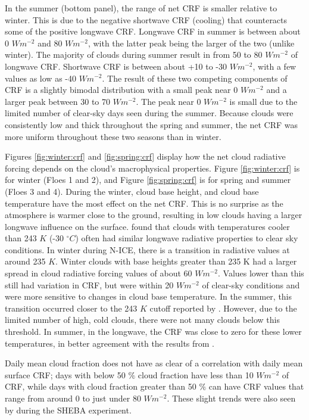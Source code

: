 In the summer (bottom panel), the range of net CRF is smaller relative to winter. This is due to the negative shortwave CRF (cooling) that counteracts some of the positive longwave CRF. Longwave CRF in summer is between about 0 $W m^{-2}$ and 80 $W m^{-2}$, with the latter peak being the larger of the two (unlike winter). The majority of clouds during summer result in from 50 to 80 $W m^{-2}$ of longwave CRF. Shortwave CRF is between about +10 to -30 $W m^{-2}$, with a few values as low as -40 $W m^{-2}$. The result of these two competing components of CRF is a slightly bimodal distribution with a small peak near 0 $W m^{-2}$ and a larger peak between 30 to 70 $W m^{-2}$. The peak near 0 $W m^{-2}$ is small due to the limited number of clear-sky days seen during the summer. Because clouds were consistently low and thick throughout the spring and summer, the net CRF was more uniform throughout these two seasons than in winter.

Figures \ref{fig:winter:crf} and \ref{fig:spring:crf} display how the net cloud radiative forcing depends on the cloud's macrophysical properties. Figure \ref{fig:winter:crf} is for winter (Floes 1 and 2), and Figure \ref{fig:spring:crf} is for spring and summer (Floes 3 and 4). During the winter, cloud base height, and cloud base temperature have the most effect on the net CRF. This is no surprise as the atmosphere is warmer close to the ground, resulting in low clouds having a larger longwave influence on the surface. \citet{shupe:2004} found that clouds with temperatures cooler than 243 $K$ (-30 $^{\circ}C$) often had similar longwave radiative properties to clear sky conditions. In winter during N-ICE, there is a transition in radiative values at around 235 $K$. Winter clouds with base heights greater than 235 K had a larger spread in cloud radiative forcing values of about 60 $W m^{-2}$. Values lower than this still had variation in CRF, but were within 20 $W m^{-2}$ of clear-sky conditions and were more sensitive to changes in cloud base temperature. In the summer, this transition occurred closer to the 243 $K$ cutoff reported by \citet{shupe:2004}. However, due to the limited number of high, cold clouds, there were not many clouds below this threshold. In summer, in the longwave, the CRF was close to zero for these lower temperatures, in better agreement with the results from \citet{shupe:2004}. 

Daily mean cloud fraction does not have as clear of a correlation with daily mean surface CRF; days with below 50 $\%$ cloud fraction have less than 10 $W m^{-2}$ of CRF, while days with cloud fraction greater than 50 $\%$ can have CRF values that range from around 0 to just under 80 $W m^{-2}$. These slight trends were also seen by \citet{shupe:2004} during the SHEBA experiment. 

